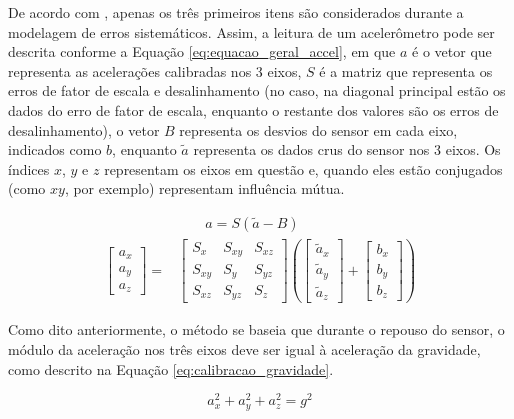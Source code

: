 \documentclass[acronym, symbols, table]{fei}
\begin{document}
			De acordo com \textcite{hassan2020field}, apenas os três primeiros itens são considerados durante a modelagem de erros sistemáticos. Assim, a leitura de um acelerômetro pode ser descrita conforme a Equação \eqref{eq:equacao_geral_accel}, em que $a$ é o vetor que representa as acelerações calibradas nos 3 eixos, $S$ é a matriz que representa os erros de fator de escala e desalinhamento (no caso, na diagonal principal estão os dados do erro de fator de escala, enquanto o restante dos valores são os erros de desalinhamento), o vetor $B$ representa os desvios do sensor em cada eixo, indicados como $b$, enquanto $\tilde{a}$ representa os dados crus do sensor nos 3 eixos. Os índices $x$, $y$ e $z$ representam os eixos em questão e, quando eles estão conjugados (como $xy$, por exemplo) representam influência mútua.
			
			\begin{equation}\label{eq:equacao_geral_accel}
				\begin{split}
					&\quad \quad a = S(\tilde{a} - B) \\
					\begin{bmatrix}
						a_x \\ a_y \\ a_z
					\end{bmatrix} = 
					&\begin{bmatrix}
						S_x & S_{xy} & S_{xz} \\ S_{xy} & S_y & S_{yz} \\ S_{xz} & S_{yz} & S_z
					\end{bmatrix} \left(
					\begin{bmatrix}
						\tilde{a}_x \\ \tilde{a}_y \\ \tilde{a}_z
					\end{bmatrix} + 
					\begin{bmatrix}
						b_x \\ b_y \\ b_z
					\end{bmatrix}\right)
				\end{split}
			\end{equation}
			
			Como dito anteriormente, o método se baseia que durante o repouso do sensor, o módulo da aceleração nos três eixos deve ser igual à aceleração da gravidade, como descrito na Equação \eqref{eq:calibracao_gravidade}.
			
			\begin{equation} \label{eq:calibracao_gravidade}
				a_{x}^{2} + a_{y}^{2} + a_{z}^{2} = g^{2}
			\end{equation}
			
\end{document}
